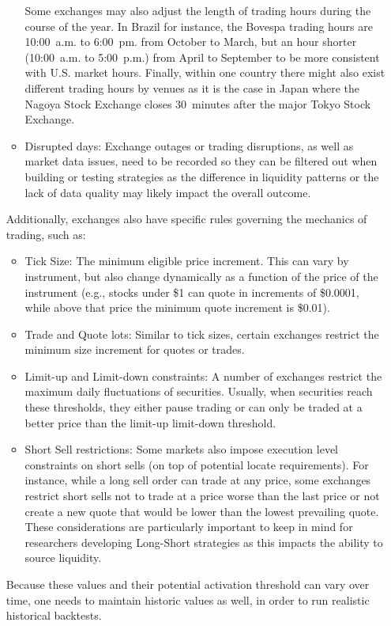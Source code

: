 \begin{itemize}
\begin{itemize}
Some exchanges may also adjust the length of trading hours during the course of the year. In Brazil for instance, the Bovespa trading hours are 10:00~a.m. to 6:00~pm. from October to March, but an hour shorter (10:00~a.m. to 5:00~p.m.) from April to September to be more consistent with U.S. market hours. Finally, within one country there might also exist different trading hours by venues as it is the case in Japan where the Nagoya Stock Exchange closes 30~minutes after the major Tokyo Stock Exchange.

\item Disrupted days: Exchange outages or trading disruptions, as well as market data issues, need to be recorded so they can be filtered out when building or testing strategies as the difference in liquidity patterns or the lack of data quality may likely impact the overall outcome.
\end{itemize}


Additionally, exchanges also have specific rules governing the mechanics of trading, such as:
        \begin{itemize}
        \item Tick Size: The minimum eligible price increment. This can vary by instrument, but also change dynamically as a function of the price of the instrument (e.g., stocks under \$1 can quote in increments of \$0.0001, while above that price the minimum quote increment is \$0.01).
        \item Trade and Quote lots: Similar to tick sizes, certain exchanges restrict the minimum size increment for quotes or trades.
        \item Limit-up and Limit-down constraints: A number of exchanges restrict the maximum daily fluctuations of securities. Usually, when securities reach these thresholds, they either pause trading or can only be traded at a better price than the limit-up limit-down threshold.
        \item Short Sell restrictions: Some markets also impose execution level constraints on short sells (on top of potential locate requirements). For instance, while a long sell order can trade at any price, some exchanges restrict short sells not to trade at a price worse than the last price or not create a new quote that would be lower than the lowest prevailing quote. These considerations are particularly important to keep in mind for researchers developing Long-Short strategies as this impacts the ability to source liquidity.
        \end{itemize}
Because these values and their potential activation threshold can vary over time, one needs to maintain historic values as well, in order to run realistic historical backtests.




\end{itemize}
